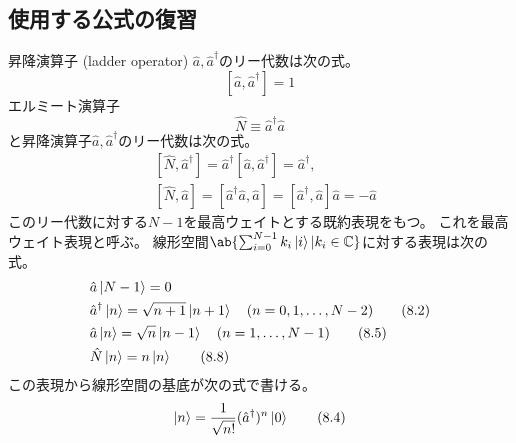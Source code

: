 
\subsection{使用する公式の復習}

昇降演算子 (ladder operator) $\hat{a},\hat{a}^\dagger$のリー代数は次の式。
\begin{equation}
  \label{eq:a_algebra}
  [\hat{a},\hat{a}^\dagger] = 1
  \tag{8.15}
\end{equation}
エルミート演算子
\begin{equation}
  \hat{N}\equiv\hat{a}^\dagger\hat{a} \tag{8.7}
\end{equation}
と昇降演算子$\hat{a},\hat{a}^\dagger$のリー代数は次の式。
\begin{equation}
  \begin{split}
    &[\hat{N},\hat{a}^\dagger]
    =\hat{a}^\dagger[\hat{a},\hat{a}^\dagger]
    =\hat{a}^\dagger, \\
    &[\hat{N},\hat{a}]
    =[\hat{a}^\dagger\hat{a},\hat{a}]
    =[\hat{a}^\dagger,\hat{a}]\hat{a}
    =-\hat{a}
  \end{split}
\end{equation}
このリー代数に対する$N-1$を最高ウェイトとする既約表現をもつ。
これを最高ウェイト表現と呼ぶ。
線形空間$\ab\{\sum_{i=0}^{N-1}k_i\ket{i}|k_i\in\mathbb{C}\}$に対する表現は次の式。
\begin{align}
   & \hat{a}\ket{N-1} = 0                       \\
   & \hat{a}^\dagger\ket{n}=\sqrt{n+1}\ket{n+1}
  \quad(n=0,1,\ldots,N-2)
  \tag{8.2}                                     \\
   & \hat{a}\ket{n}=\sqrt{n}\ket{n-1}
  \quad(n=1,\ldots,N-1)
  \tag{8.5}                                     \\
   & \hat{N}\ket{n}=n\ket{n}
  \tag{8.8}
  \label{eq:number_op_repr}
\end{align}
この表現から線形空間の基底が次の式で書ける。
\begin{equation}
  \label{eq:num_eigenvec}
  \ket{n}
  =\frac{1}{\sqrt{n!}}(\hat{a}^\dagger)^n\ket{0}
  \tag{8.4}
\end{equation}

